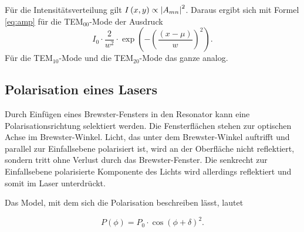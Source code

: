 Für die Intensitätsverteilung gilt $I\left(x,y\right) \propto \absolutevalue{A_{mn}}^2$. Daraus ergibt sich mit Formel \eqref{eq:amp} für die 
TEM$_{00}$-Mode der Ausdruck 
\begin{equation}
    I_0 \cdot \frac{2}{w^2} \cdot \exp\left(-\left(\frac{(x - \mu)}{w}\right)^2\right).
    \label{eq:mode0}
\end{equation}
Für die TEM$_{10}$-Mode und die TEM$_{20}$-Mode das ganze analog.










\subsection{Polarisation eines Lasers}
Durch Einfügen eines Brewster-Fensters in den Resonator kann eine Polarisationsrichtung selektiert werden.
Die Fensterflächen stehen  zur optischen Achse im Brewster-Winkel. Licht, das unter dem Brewster-Winkel auftrifft und parallel zur Einfallsebene polarisiert ist, wird an der Oberfläche nicht reflektiert, sondern tritt ohne Verlust durch das Brewster-Fenster. Die senkrecht zur Einfallsebene polarisierte Komponente des Lichts wird allerdings reflektiert und somit im Laser unterdrückt.

Das Model, mit dem sich die Polarisation beschreiben lässt, lautet 

\begin{equation}
    P(\phi) = P_0 \cdot \cos\left( \phi + \delta \right)^2. 
    \label{eq:polar}
\end{equation}
